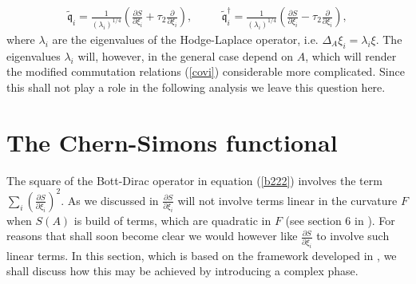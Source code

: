 \documentclass[letterpaper,11pt]{article}
\newcommand{\pa}{\partial}
\begin{document}
\begin{eqnarray}
\tilde{\mathfrak{q}}_i =  \frac{1}{(\lambda_i)^{{1}/{4}}} \left( \frac{\pa S}{\pa \xi_i}+ {\tau_2}   \frac{\pa}{\pa\xi_i}\right)  , &&\quad
\tilde{\mathfrak{q}}_i^\dagger =  \frac{1}{(\lambda_i)^{{1}/{4}}}  \left( \frac{\pa S}{\pa \xi_i} - {\tau_2}\frac{\pa}{\pa\xi_i} \right) ,
\label{morten2}
\end{eqnarray}
where $\lambda_i$ are the eigenvalues of the Hodge-Laplace operator, i.e. $\Delta_A \xi_i=\lambda_i \xi$. The eigenvalues $\lambda_i$  will, however, in the general case depend on $A$, which will render the modified commutation relations (\ref{covi}) considerable more complicated. Since this shall not play a role in the following analysis we leave this question here.

























































\section{The Chern-Simons functional}
\label{secCS}








The square of the Bott-Dirac operator in equation (\ref{b222}) involves the term $\sum_i \left( \frac{\pa S}{\pa \xi_i}\right)^2$. As we discussed in \cite{Aastrup:2019yui} $\frac{\pa S}{\pa \xi_i}$ will not involve terms linear in the curvature $F$ when $S(A)$ is build of terms, which are quadratic in $F$ (see section 6 in \cite{Aastrup:2019yui}). For reasons that shall soon become clear we would however like $\frac{\pa S}{\pa \xi_i}$ to involve such linear terms. In this section, which is based on the framework developed in \cite{Aastrup:2019yui}, we shall discuss how this may be achieved by introducing a complex phase.\\
\end{document}
